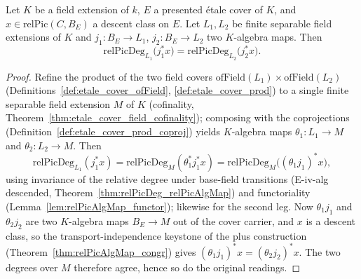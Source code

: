 \begin{theorem}
  \label{thm:relPicDeg_relPicAlgMap_congr}
  \leanok
  Let \(K\) be a field extension of \(k\), \(E\) a presented \'etale cover of \(K\), and
  \(x \in \mathrm{relPic}(C, B_E)\) a descent class on \(E\). Let \(L_1, L_2\) be finite
  separable field extensions of \(K\) and \(j_1 \colon B_E \to L_1\),
  \(j_2 \colon B_E \to L_2\) two \(K\)-algebra maps. Then
  \[
    \mathrm{relPicDeg}_{L_1}\bigl(j_1^{*} x\bigr)
      = \mathrm{relPicDeg}_{L_2}\bigl(j_2^{*} x\bigr).
  \]
\end{theorem}
\begin{proof}
  \leanok
  Refine the product of the two field covers \(\mathrm{ofField}(L_1) \times
  \mathrm{ofField}(L_2)\) (Definitions~\ref{def:etale_cover_ofField},
  \ref{def:etale_cover_prod}) to a single finite separable field extension \(M\) of \(K\)
  (cofinality, Theorem~\ref{thm:etale_cover_field_cofinality}); composing with the
  coprojections (Definition~\ref{def:etale_cover_prod_coproj}) yields \(K\)-algebra maps
  \(\theta_1 \colon L_1 \to M\) and \(\theta_2 \colon L_2 \to M\). Then
  \[
    \mathrm{relPicDeg}_{L_1}(j_1^{*} x)
      = \mathrm{relPicDeg}_{M}(\theta_1^{*} j_1^{*} x)
      = \mathrm{relPicDeg}_{M}\bigl((\theta_1 j_1)^{*} x\bigr),
  \]
  using invariance of the relative degree under base-field transitions (E-iv-alg descended,
  Theorem~\ref{thm:relPicDeg_relPicAlgMap}) and functoriality
  (Lemma~\ref{lem:relPicAlgMap_functor}); likewise for the second leg. Now \(\theta_1 j_1\)
  and \(\theta_2 j_2\) are two \(K\)-algebra maps \(B_E \to M\) out of the cover carrier, and
  \(x\) is a descent class, so the transport-independence keystone of the plus construction
  (Theorem~\ref{thm:relPicAlgMap_congr}) gives \((\theta_1 j_1)^{*} x = (\theta_2 j_2)^{*} x\).
  The two degrees over \(M\) therefore agree, hence so do the original readings.
\end{proof}

